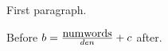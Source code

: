 \documentclass{article}
\begin{document}
First paragraph.

Before $b = \frac{\mbox{num\par words}}{den} + c \lxmbf$ after.
\end{document}
